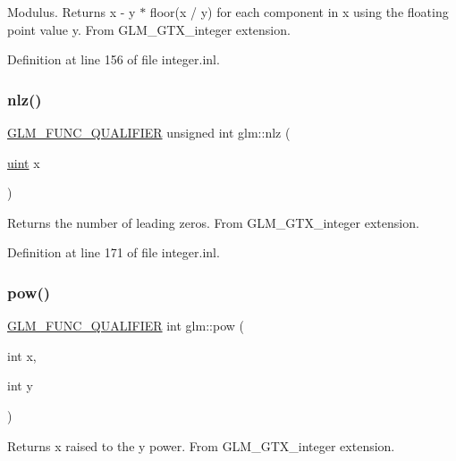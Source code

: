 Modulus. Returns x -\/ y $\ast$ floor(x / y) for each component in x using the floating point value y. From G\+L\+M\+\_\+\+G\+T\+X\+\_\+integer extension. 

Definition at line 156 of file integer.\+inl.

\mbox{\label{group__gtx__integer_gacbe62fd2384464c16ea30ecc4defc11c}} 
\subsubsection{\texorpdfstring{nlz()}{nlz()}}
{\footnotesize\ttfamily \hyperlink{setup_8hpp_a33fdea6f91c5f834105f7415e2a64407}{G\+L\+M\+\_\+\+F\+U\+N\+C\+\_\+\+Q\+U\+A\+L\+I\+F\+I\+ER} unsigned int glm\+::nlz (\begin{DoxyParamCaption}\item[{\hyperlink{group__core__precision_ga4fd29415871152bfb5abd588334147c8}{uint}}]{x }\end{DoxyParamCaption})}

Returns the number of leading zeros. From G\+L\+M\+\_\+\+G\+T\+X\+\_\+integer extension. 

Definition at line 171 of file integer.\+inl.

\mbox{\label{group__gtx__integer_ga9642514a44a67afa70966d756f040ca9}} 
\subsubsection{\texorpdfstring{pow()}{pow()}\hspace{0.1cm}{\footnotesize\ttfamily [1/2]}}
{\footnotesize\ttfamily \hyperlink{setup_8hpp_a33fdea6f91c5f834105f7415e2a64407}{G\+L\+M\+\_\+\+F\+U\+N\+C\+\_\+\+Q\+U\+A\+L\+I\+F\+I\+ER} int glm\+::pow (\begin{DoxyParamCaption}\item[{int}]{x,  }\item[{int}]{y }\end{DoxyParamCaption})}

Returns x raised to the y power. From G\+L\+M\+\_\+\+G\+T\+X\+\_\+integer extension. 

